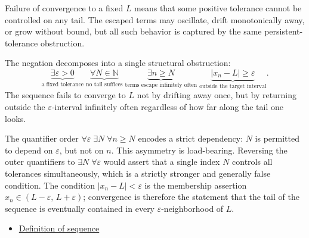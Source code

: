 \begin{remark*}
Failure of convergence to a fixed $L$ means that some positive tolerance
cannot be controlled on any tail. The escaped terms may oscillate, drift
monotonically away, or grow without bound, but all such behavior is
captured by the same persistent-tolerance obstruction.
\end{remark*}

\begin{remark*}
The negation decomposes into a single structural obstruction:
\[
\underbrace{\exists \varepsilon > 0}_{\text{a fixed tolerance}}
\;\underbrace{\forall N \in \mathbb{N}}_{\text{no tail suffices}}
\;\underbrace{\exists n \ge N}_{\text{terms escape infinitely often}}
\;\underbrace{|x_n - L| \ge \varepsilon}_{\text{outside the target interval}}.
\]
The sequence fails to converge to $L$ not by drifting away once, but
by returning outside the $\varepsilon$-interval infinitely often regardless
of how far along the tail one looks.
\end{remark*}

\begin{remark*}[Interpretation]
The quantifier order $\forall \varepsilon \;\exists N \;\forall n \ge N$
encodes a strict dependency: $N$ is permitted to depend on $\varepsilon$,
but not on $n$. This asymmetry is load-bearing. Reversing the outer
quantifiers to $\exists N \;\forall \varepsilon$ would assert that a
single index $N$ controls all tolerances simultaneously, which is a
strictly stronger and generally false condition. The condition
$|x_n - L| < \varepsilon$ is the membership assertion $x_n \in (L -
\varepsilon,\, L + \varepsilon)$; convergence is therefore the statement
that the tail of the sequence is eventually contained in every
$\varepsilon$-neighborhood of $L$.
\end{remark*}

\begin{remark*}[Dependencies]
\begin{itemize}
  \item \hyperref[def:sequence]{Definition of sequence}
\end{itemize}
\end{remark*}

